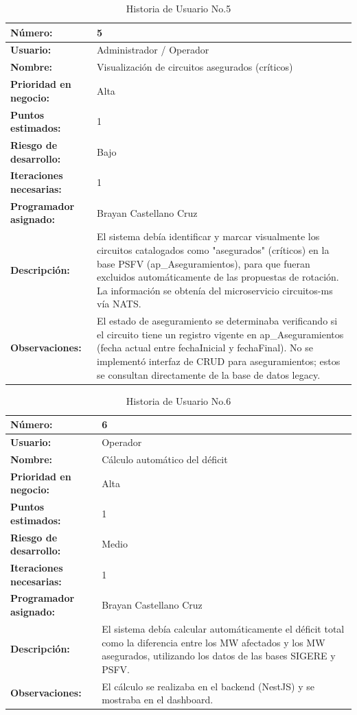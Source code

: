 \begin{table}[H]
\centering
\caption{Historia de Usuario No.5}
\label{tab:hu_05}
\footnotesize
\begin{tabular}{|p{3cm}|p{9cm}|}
\hline
\textbf{Número:} & 5 \\
\hline
\textbf{Usuario:} & Administrador / Operador \\
\hline
\textbf{Nombre:} & Visualización de circuitos asegurados (críticos) \\
\hline
\textbf{Prioridad en negocio:} & Alta \\
\hline
\textbf{Puntos estimados:} & 1 \\
\hline
\textbf{Riesgo de desarrollo:} & Bajo \\
\hline
\textbf{Iteraciones necesarias:} & 1 \\
\hline
\textbf{Programador asignado:} & Brayan Castellano Cruz \\
\hline
\textbf{Descripción:} & El sistema debía identificar y marcar visualmente los circuitos catalogados como "asegurados" (críticos) en la base PSFV (ap\_Aseguramientos), para que fueran excluidos automáticamente de las propuestas de rotación. La información se obtenía del microservicio circuitos-ms vía NATS. \\
\hline
\textbf{Observaciones:} & El estado de aseguramiento se determinaba verificando si el circuito tiene un registro vigente en ap\_Aseguramientos (fecha actual entre fechaInicial y fechaFinal). No se implementó interfaz de CRUD para aseguramientos; estos se consultan directamente de la base de datos legacy. \\
\hline
\end{tabular}
\end{table}

\begin{table}[H]
\centering
\caption{Historia de Usuario No.6}
\label{tab:hu_06}
\footnotesize
\begin{tabular}{|p{3cm}|p{9cm}|}
\hline
\textbf{Número:} & 6 \\
\hline
\textbf{Usuario:} & Operador \\
\hline
\textbf{Nombre:} & Cálculo automático del déficit \\
\hline
\textbf{Prioridad en negocio:} & Alta \\
\hline
\textbf{Puntos estimados:} & 1 \\
\hline
\textbf{Riesgo de desarrollo:} & Medio \\
\hline
\textbf{Iteraciones necesarias:} & 1 \\
\hline
\textbf{Programador asignado:} & Brayan Castellano Cruz \\
\hline
\textbf{Descripción:} & El sistema debía calcular automáticamente el déficit total como la diferencia entre los MW afectados y los MW asegurados, utilizando los datos de las bases SIGERE y PSFV. \\
\hline
\textbf{Observaciones:} & El cálculo se realizaba en el backend (NestJS) y se mostraba en el dashboard. \\
\hline
\end{tabular}
\end{table}

